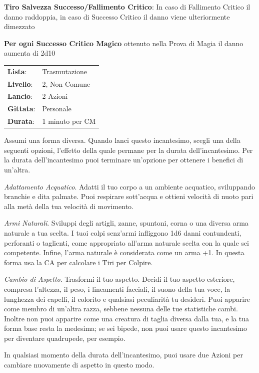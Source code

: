 \begin{multicols}{2}
\textbf{Tiro Salvezza Successo/Fallimento Critico}: In caso di Fallimento Critico il danno raddoppia, in caso di Successo Critico il danno viene ulteriormente dimezzato

\textbf{Per ogni Successo Critico Magico} ottenuto nella Prova di Magia il danno aumenta di 2d10

\noindent\begin{tabularx}{\linewidth}{p{1.3cm}X}
	\rowcolor{gray!20}\textbf{Lista}: & Trasmutazione \\
	\textbf{Livello}: & 2, Non Comune \\
	\rowcolor{gray!20}\textbf{Lancio}: & 2 Azioni \\
	\textbf{Gittata}: & Personale \\
	\rowcolor{gray!20}\textbf{Durata}: & 1 minuto per CM \\
\end{tabularx}\smallskip

\label{Alter Self}Assumi una forma diversa. Quando lanci questo incantesimo, scegli una della seguenti opzioni, l'effetto della quale permane per la durata dell'incantesimo. Per la durata dell'incantesimo puoi terminare un'opzione per ottenere i benefici di un'altra.

\emph{Adattamento Acquatico}. Adatti il tuo corpo a un ambiente acquatico, sviluppando branchie e dita palmate. Puoi respirare sott'acqua e ottieni velocità di nuoto pari alla metà della tua velocità di movimento.

\emph{Armi Naturali}. Sviluppi degli artigli, zanne, spuntoni, corna o una diversa arma naturale a tua scelta. I tuoi colpi senz'armi infliggono 1d6 danni contundenti, perforanti o taglienti, come appropriato all'arma naturale scelta con la quale sei competente. Infine, l'arma naturale è considerata come un arma +1. In questa forma usa la CA per calcolare i Tiri per Colpire.

\emph{Cambio di Aspetto}. Trasformi il tuo aspetto. Decidi il tuo aspetto esteriore, compresa l'altezza, il peso, i lineamenti facciali, il suono della tua voce, la lunghezza dei capelli, il colorito e qualsiasi peculiarità tu desideri. Puoi apparire come membro di un'altra razza, sebbene nessuna delle tue statistiche cambi. Inoltre non puoi apparire come una creatura di taglia diversa dalla tua, e la tua forma base resta la medesima; se sei bipede, non puoi usare questo incantesimo per diventare quadrupede, per esempio.

In qualsiasi momento della durata dell'incantesimo, puoi usare due Azioni per cambiare nuovamente di aspetto in questo modo.


\end{multicols}
